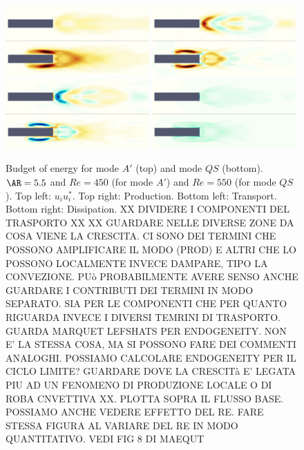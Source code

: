 \begin{figure}
  \centering
  \includegraphics[width=0.49\textwidth]{./fig/AR5s/Ener_AR5p5_Re450_Re550_beta2.png}
  \includegraphics[width=0.49\textwidth]{./fig/AR5s/Prod_AR5p5_Re450_Re550_beta2.png}
  \includegraphics[width=0.49\textwidth]{./fig/AR5s/Trsp_AR5p5_Re450_Re550_beta2.png}
  \includegraphics[width=0.49\textwidth]{./fig/AR5s/Diss_AR5p5_Re450_Re550_beta2.png}
  \caption{Budget of energy for mode $A'$ (top) and mode $QS$ (bottom). $\AR=5.5$ and $Re=450$ (for mode $A'$) and $Re=550$ (for mode $QS$). Top left: $u_i u_i^*$. Top right: Production. Bottom left: Transport. Bottom right: Dissipation. XX DIVIDERE I COMPONENTI DEL TRASPORTO XX XX GUARDARE NELLE DIVERSE ZONE DA COSA VIENE LA CRESCITA. CI SONO DEI TERMINI CHE POSSONO AMPLIFICARE IL MODO (PROD) E ALTRI CHE LO POSSONO LOCALMENTE INVECE DAMPARE, TIPO LA CONVEZIONE. PUò PROBABILMENTE AVERE SENSO ANCHE GUARDARE I CONTRIBUTI DEI TERMINI IN MODO SEPARATO. SIA PER LE COMPONENTI CHE PER QUANTO RIGUARDA INVECE I DIVERSI TEMRINI DI TRASPORTO. GUARDA MARQUET LEFSHATS PER ENDOGENEITY. NON E' LA STESSA COSA, MA SI POSSONO FARE DEI COMMENTI ANALOGHI. POSSIAMO CALCOLARE ENDOGENEITY PER IL CICLO LIMITE? GUARDARE DOVE LA CRESCITà E' LEGATA PIU AD UN FENOMENO DI PRODUZIONE LOCALE O DI ROBA CNVETTIVA XX. PLOTTA SOPRA IL FLUSSO BASE. POSSIAMO ANCHE VEDERE EFFETTO DEL RE. FARE STESSA FIGURA AL VARIARE DEL RE IN MODO QUANTITATIVO. VEDI FIG 8 DI MAEQUT}
  \label{fig:budget_ener}
\end{figure}

